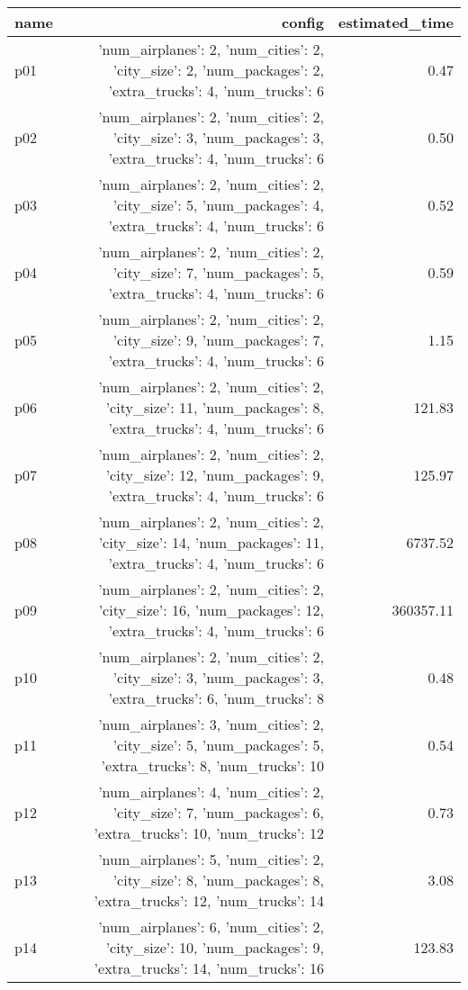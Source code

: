 \documentclass{article}
\begin{document}
                            \begin{center}
                            \scriptsize
                            \begin{tabular}{@{}l|r|r@{}}
                            name & config & estimated\_time\\\midrule
                              p01&{'num\_airplanes': 2, 'num\_cities': 2, 'city\_size': 2, 'num\_packages': 2, 'extra\_trucks': 4, 'num\_trucks': 6}&0.47\\
  p02&{'num\_airplanes': 2, 'num\_cities': 2, 'city\_size': 3, 'num\_packages': 3, 'extra\_trucks': 4, 'num\_trucks': 6}&0.50\\
  p03&{'num\_airplanes': 2, 'num\_cities': 2, 'city\_size': 5, 'num\_packages': 4, 'extra\_trucks': 4, 'num\_trucks': 6}&0.52\\
  p04&{'num\_airplanes': 2, 'num\_cities': 2, 'city\_size': 7, 'num\_packages': 5, 'extra\_trucks': 4, 'num\_trucks': 6}&0.59\\
  p05&{'num\_airplanes': 2, 'num\_cities': 2, 'city\_size': 9, 'num\_packages': 7, 'extra\_trucks': 4, 'num\_trucks': 6}&1.15\\
  p06&{'num\_airplanes': 2, 'num\_cities': 2, 'city\_size': 11, 'num\_packages': 8, 'extra\_trucks': 4, 'num\_trucks': 6}&121.83\\
  p07&{'num\_airplanes': 2, 'num\_cities': 2, 'city\_size': 12, 'num\_packages': 9, 'extra\_trucks': 4, 'num\_trucks': 6}&125.97\\
  p08&{'num\_airplanes': 2, 'num\_cities': 2, 'city\_size': 14, 'num\_packages': 11, 'extra\_trucks': 4, 'num\_trucks': 6}&6737.52\\
  p09&{'num\_airplanes': 2, 'num\_cities': 2, 'city\_size': 16, 'num\_packages': 12, 'extra\_trucks': 4, 'num\_trucks': 6}&360357.11\\
  p10&{'num\_airplanes': 2, 'num\_cities': 2, 'city\_size': 3, 'num\_packages': 3, 'extra\_trucks': 6, 'num\_trucks': 8}&0.48\\
  p11&{'num\_airplanes': 3, 'num\_cities': 2, 'city\_size': 5, 'num\_packages': 5, 'extra\_trucks': 8, 'num\_trucks': 10}&0.54\\
  p12&{'num\_airplanes': 4, 'num\_cities': 2, 'city\_size': 7, 'num\_packages': 6, 'extra\_trucks': 10, 'num\_trucks': 12}&0.73\\
  p13&{'num\_airplanes': 5, 'num\_cities': 2, 'city\_size': 8, 'num\_packages': 8, 'extra\_trucks': 12, 'num\_trucks': 14}&3.08\\
  p14&{'num\_airplanes': 6, 'num\_cities': 2, 'city\_size': 10, 'num\_packages': 9, 'extra\_trucks': 14, 'num\_trucks': 16}&123.83\\

\end{tabular}
\end{center}
\end{document}
